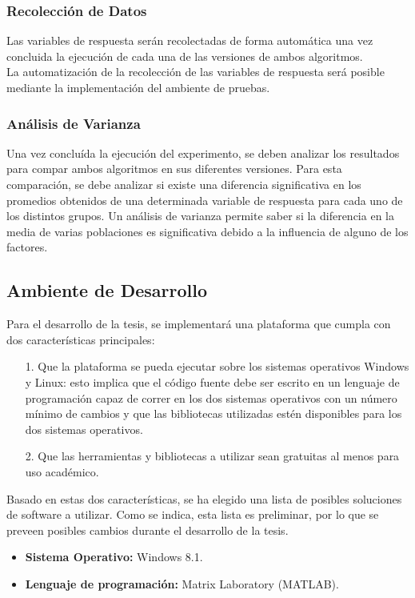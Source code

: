 \subsubsection{Recolecci\'on de Datos}
Las variables de respuesta ser\'an recolectadas de forma autom\'atica una vez concluida la ejecuci\'on de cada una de las versiones de ambos algoritmos.\\
La automatizaci\'on de la recolecci\'on de las variables de respuesta ser\'a posible mediante la implementaci\'on del ambiente de pruebas.
\subsubsection{An\'alisis de Varianza}
Una vez conclu\'ida la ejecuci\'on del experimento, se deben analizar los resultados para compar ambos algoritmos en sus diferentes versiones. Para esta comparaci\'on, se debe analizar si existe una diferencia significativa en los promedios obtenidos de una determinada variable de respuesta para cada uno de los distintos grupos. Un an\'alisis de varianza permite saber si la diferencia en la media de varias poblaciones es significativa debido a la influencia de alguno de los factores.\\

\subsection{Ambiente de Desarrollo}
Para el desarrollo de la tesis, se implementar\'a una plataforma que cumpla con dos caracter\'isticas principales:
\begin{itemize}
\item [1.] Que la plataforma se pueda ejecutar sobre los sistemas operativos Windows y Linux: esto implica que el c\'odigo fuente debe ser escrito en un lenguaje de programaci\'on capaz de correr en los dos sistemas operativos con un n\'umero m\'inimo de cambios y que las bibliotecas utilizadas est\'en disponibles para los dos sistemas operativos.
\item [2.] Que las herramientas y bibliotecas a utilizar sean gratuitas al menos para uso acad\'emico.
\end{itemize}
Basado en estas dos caracter\'isticas, se ha elegido una lista de posibles soluciones de software a utilizar. Como se indica, esta lista es preliminar, por lo que se preveen posibles cambios durante el desarrollo de la tesis.
\begin{itemize}
\item \textbf{Sistema Operativo:} Windows 8.1.
\item \textbf{Lenguaje de programaci\'on:} Matrix Laboratory (MATLAB).
\end{itemize}
